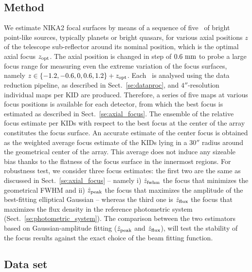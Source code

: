 \subsection{Method}

We estimate NIKA2 focal surfaces by means of a sequence of five \bms\ of bright
point-like sources, typically planets or bright quasars, for various
axial positions $z$ of the telescope sub-reflector around its nominal
position, which is the optimal axial focus $z_{\rm{opt}}$. 
The axial position is changed in step of $0.6~\rm{mm}$ to probe a large
focus range for measuring even the extreme variation of the focus surfaces,
namely $z \in \{-1.2, -0.6, 0, 0.6, 1.2 \} + z_{\rm{opt}}$.  Each
\bm\ is analysed using the data reduction pipeline, as described in
Sect.~\ref{se:dataproc}, and $4''$-resolution individual maps per KID
are produced. 
Therefore, a series of
five maps at various focus positions is available for each detector, from which
the best focus is estimated as described in Sect.~\ref{se:axial_focus}. The
ensemble of the relative focus estimate per KIDs with respect to the best focus
at the center of the array constitutes the focus surface. An accurate estimate
of the center focus is obtained as the weighted average focus estimate of the
KIDs lying in a $30''$ radius around the geometrical center of the array. This
average does not induce any sizeable bias thanks to the flatness of the focus
surface in the innermost regions. For robustness test, we consider three focus
estimates: the first two are the same as discussed in
Sect.~\ref{se:axial_focus} -- namely i) $\hat z_{\rm{fwhm}}$ the focus that
minimizes the geometrical FWHM and ii) $\hat z_{\rm{peak}}$ the focus that
maximizes the amplitude of the best-fitting elliptical Gaussian -- whereas the
third one is $\hat z_{\rm{flux}}$ the focus that maximizes the flux
density in the reference photometric system
(Sect.~\ref{se:photometric_system}). The comparison between the two
estimators based on Gaussian-amplitude fitting ($\hat z_{\rm{peak}}$
and $\hat z_{\rm{flux}}$), will test the stability of the focus
results against the exact choice of the beam fitting function.


\subsection{Data set}

